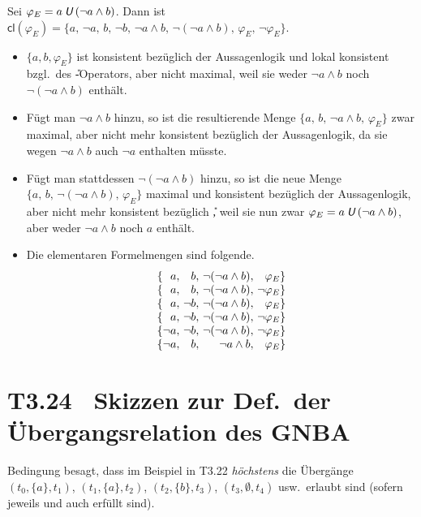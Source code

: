 \documentclass[fontsize=11pt, twoside=false, numbers=autoenddot]{scrbook}
\begin{document}
Sei $\varphi_E = a\mathbin{\textit{\textsf{U}}}(\lnot a \land b)$.
Dann ist $\textsf{cl}(\varphi_E) = \{a,\, \lnot a,\, b,\, \lnot b,\, \lnot a \land b,\, \lnot(\lnot a \land b),\, \varphi_E,\, \lnot \varphi_E\}$.
%
\begin{itemize}
  \item
    $\{a,b,\varphi_E\}$ ist konsistent bezüglich der Aussagenlogik und lokal konsistent bzgl.\ des \U-Operators,
    aber nicht maximal, weil sie weder $\lnot a \land b$ noch $\lnot(\lnot a \land b)$ enthält.
  \item
    Fügt man $\lnot a \land b$ hinzu, so ist die resultierende Menge $\{a,\,b,\,\lnot a \land b,\,\varphi_E\}$ 
    zwar maximal, aber nicht mehr konsistent bezüglich der Aussagenlogik,
    da sie wegen $\lnot a \land b$ auch $\lnot a$ enthalten müsste.
  \item
    Fügt man stattdessen $\lnot(\lnot a \land b)$ hinzu, 
    so ist die neue Menge \mbox{$\{a,\,b,\,\lnot(\lnot a \land b),\,\varphi_E\}$}
    maximal und konsistent bezüglich der Aussagenlogik,
    aber nicht mehr konsistent bezüglich \U,
    weil sie nun zwar $\varphi_E = a \mathbin{\textit{\textsf{U}}} (\lnot a \land b)$,
    aber weder $\lnot a \land b$ noch $a$ enthält.
  \item
    Die elementaren Formelmengen sind folgende.
    \[
      \begin{array}{@{\{}r@{,~}r@{,~}r@{,~}r@{\}}}
        a       & b       & \lnot(\lnot a \land b) & \varphi_E      \\
        a       & b       & \lnot(\lnot a \land b) & \lnot\varphi_E \\
        a       & \lnot b & \lnot(\lnot a \land b) & \varphi_E      \\
        a       & \lnot b & \lnot(\lnot a \land b) & \lnot\varphi_E \\
        \lnot a & \lnot b & \lnot(\lnot a \land b) & \lnot\varphi_E \\
        \lnot a & b       & \lnot a \land b        & \varphi_E
      \end{array}
    \]
\end{itemize}

\section*{T3.24~ Skizzen zur Def.\ der Übergangsrelation des GNBA}

Bedingung  besagt, dass im Beispiel in T3.22 \emph{höchstens}
die Übergänge $(t_0,\{a\},t_1)$, $(t_1,\{a\},t_2)$, $(t_2,\{b\},t_3)$, $(t_3,\emptyset,t_4)$ usw.\
erlaubt sind (sofern jeweils  und  auch erfüllt sind).
\end{document}
